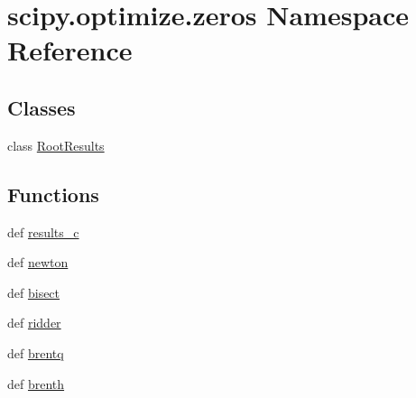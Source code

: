 \hypertarget{namespacescipy_1_1optimize_1_1zeros}{}\section{scipy.\+optimize.\+zeros Namespace Reference}
\label{namespacescipy_1_1optimize_1_1zeros}
\subsection*{Classes}
\begin{DoxyCompactItemize}
\item 
class \hyperlink{classscipy_1_1optimize_1_1zeros_1_1RootResults}{Root\+Results}
\end{DoxyCompactItemize}
\subsection*{Functions}
\begin{DoxyCompactItemize}
\item 
def \hyperlink{namespacescipy_1_1optimize_1_1zeros_aeaa5e32ae93421ba62caeff5fa44380f}{results\+\_\+c}
\item 
def \hyperlink{namespacescipy_1_1optimize_1_1zeros_a68360f1b4d04cd5b9b379ad9c9f83d8b}{newton}
\item 
def \hyperlink{namespacescipy_1_1optimize_1_1zeros_a83315ba9f5f00391cade4e5d4a5e3a0c}{bisect}
\item 
def \hyperlink{namespacescipy_1_1optimize_1_1zeros_a9c9f8fc893c60c2dd83d4f104525a076}{ridder}
\item 
def \hyperlink{namespacescipy_1_1optimize_1_1zeros_ad80f0ae5fa1147fe0c77cd6159380b59}{brentq}
\item 
def \hyperlink{namespacescipy_1_1optimize_1_1zeros_a46554b03f9304e126d5f4330727cd131}{brenth}
\end{DoxyCompactItemize}
